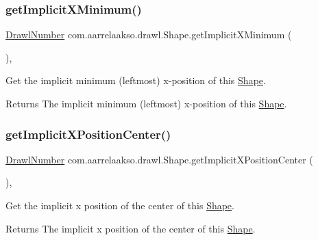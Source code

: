 \subsubsection{\texorpdfstring{get\+Implicit\+X\+Minimum()}{getImplicitXMinimum()}}
{\footnotesize\ttfamily \hyperlink{classcom_1_1aarrelaakso_1_1drawl_1_1_drawl_number}{Drawl\+Number} com.\+aarrelaakso.\+drawl.\+Shape.\+get\+Implicit\+X\+Minimum (\begin{DoxyParamCaption}{ }\end{DoxyParamCaption})\hspace{0.3cm}{\ttfamily [protected]}, {\ttfamily [inherited]}}



Get the implicit minimum (leftmost) x-\/position of this \hyperlink{classcom_1_1aarrelaakso_1_1drawl_1_1_shape}{Shape}. 

\begin{DoxyReturn}{Returns}
The implicit minimum (leftmost) x-\/position of this \hyperlink{classcom_1_1aarrelaakso_1_1drawl_1_1_shape}{Shape}. 
\end{DoxyReturn}
\mbox{\label{classcom_1_1aarrelaakso_1_1drawl_1_1_shape_ac7a69f5cb9dd954f5054a3bebc35af41}} 
\subsubsection{\texorpdfstring{get\+Implicit\+X\+Position\+Center()}{getImplicitXPositionCenter()}}
{\footnotesize\ttfamily \hyperlink{classcom_1_1aarrelaakso_1_1drawl_1_1_drawl_number}{Drawl\+Number} com.\+aarrelaakso.\+drawl.\+Shape.\+get\+Implicit\+X\+Position\+Center (\begin{DoxyParamCaption}{ }\end{DoxyParamCaption})\hspace{0.3cm}{\ttfamily [protected]}, {\ttfamily [inherited]}}



Get the implicit x position of the center of this \hyperlink{classcom_1_1aarrelaakso_1_1drawl_1_1_shape}{Shape}. 

\begin{DoxyReturn}{Returns}
The implicit x position of the center of this \hyperlink{classcom_1_1aarrelaakso_1_1drawl_1_1_shape}{Shape}. 
\end{DoxyReturn}
\mbox{\label{classcom_1_1aarrelaakso_1_1drawl_1_1_shape_a3cc59779e8ce4a98ff2309e0fb414527}} 

